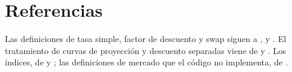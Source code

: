 \section{Referencias}\label{sec:cap03-referencias}

Las definiciones de tasa simple, factor de descuento y swap siguen a \citet{brigo2006}, \citet{hull2018} y
\citet{andersen2010}. El tratamiento de curvas de proyección y descuento separadas viene de
\citet{ametrano2013} y \citet{fujii2009}. Los índices, de \citet{banxico2021} y \citet{nyfed2026}; las
definiciones de mercado que el código no implementa, de \citet{isda2021}.

